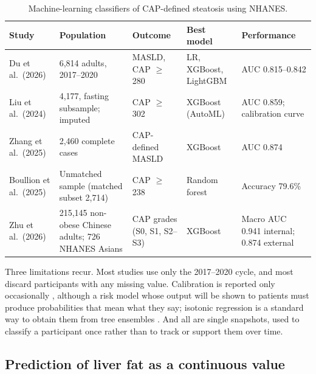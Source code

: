 \begin{table}[t]
\centering
\small
\caption{Machine-learning classifiers of CAP-defined steatosis using NHANES.}
\label{tab:nhanes-clf}
\begin{tabularx}{\textwidth}{@{}>{\raggedright\arraybackslash}p{2.6cm} Y Y Y Y@{}}
\toprule
Study & Population & Outcome & Best model & Performance \\
\midrule
Du et al.\ (2026) \cite{du2026masld} & 6,814 adults, 2017--2020 & MASLD, CAP $\geq$ 280 & LR, XGBoost, LightGBM & AUC 0.815--0.842 \\
Liu et al.\ (2024) \cite{liu2024automl} & 4,177, fasting subsample; imputed & CAP $\geq$ 302 & XGBoost (AutoML) & AUC 0.859; calibration curve \\
Zhang et al.\ (2025) \cite{zhang2025masld} & 2,460 complete cases & CAP-defined MASLD & XGBoost & AUC 0.874 \\
Boullion et al.\ (2025) \cite{boullion2025biomarker} & Unmatched sample (matched subset 2,714) & CAP $\geq$ 238 & Random forest & Accuracy 79.6\% \\
Zhu et al.\ (2026) \cite{zhu2026nonobese} & 215,145 non-obese Chinese adults; 726 NHANES Asians & CAP grades (S0, S1, S2--S3) & XGBoost & Macro AUC 0.941 internal; 0.874 external \\
\bottomrule
\end{tabularx}
\end{table}

Three limitations recur. Most studies use only the 2017--2020 cycle, and most discard participants with any missing value. Calibration is reported only occasionally \cite{liu2024automl}, although a risk model whose output will be shown to patients must produce probabilities that mean what they say; isotonic regression is a standard way to obtain them from tree ensembles \cite{zadrozny2002calibration}. And all are single snapshots, used to classify a participant once rather than to track or support them over time.

\subsection{Prediction of liver fat as a continuous value}

